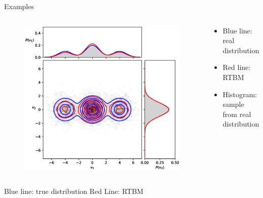 \documentclass[10pt]{beamer}
\begin{document}
\begin{frame}{Examples}
\begin{columns}
\begin{column}[]{0.7 \textwidth}
\begin{figure}
                \includegraphics[scale=0.30]{figures/ThreeGaussians2d.eps} 
            \end{figure}
        \end{column}
        \begin{column}{0.3 \textwidth}
            \begin{itemize}
                \item Blue line: real distribution
                \item Red line: RTBM
                \item Histogram: sample from real distribution
            \end{itemize}
            
        \end{column}
      \end{columns}

       


Blue line: true distribution
Red Line: RTBM 
\end{frame}
\end{document}
